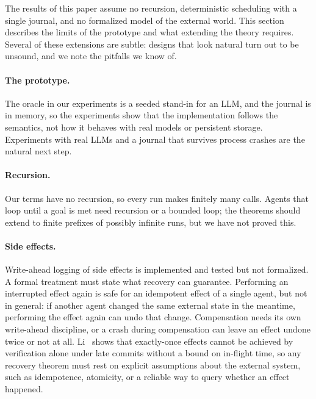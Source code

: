 
The results of this paper assume no recursion, deterministic scheduling with a single journal,
and no formalized model of the external world.
This section describes the limits of the prototype and what extending the theory requires.
Several of these extensions are subtle: designs that look natural turn out to be unsound, and we
note the pitfalls we know of.

\paragraph{The prototype.}
The oracle in our experiments is a seeded stand-in for an LLM, and the journal is in memory, so
the experiments show that the implementation follows the semantics, not how it behaves with
real models or persistent storage.
Experiments with real LLMs and a journal that survives process crashes are the natural next
step.

\paragraph{Recursion.}
Our terms have no recursion, so every run makes finitely many calls.
Agents that loop until a goal is met need recursion or a bounded loop; the theorems should
extend to finite prefixes of possibly infinite runs, but we have not proved this.

\paragraph{Side effects.}
Write-ahead logging of side effects is implemented and tested but not formalized.
A formal treatment must state what recovery can guarantee.
Performing an interrupted effect again is safe for an idempotent effect of a single agent, but
not in general: if another agent changed the same external state in the meantime, performing
the effect again can undo that change.
Compensation needs its own write-ahead discipline, or a crash during compensation can leave an
effect undone twice or not at all.
Li~\citep{li2026exactlyonce} shows that exactly-once effects cannot be achieved by verification
alone under late commits without a bound on in-flight time, so any recovery theorem must rest on
explicit assumptions about the external system, such as idempotence, atomicity, or a reliable
way to query whether an effect happened.

